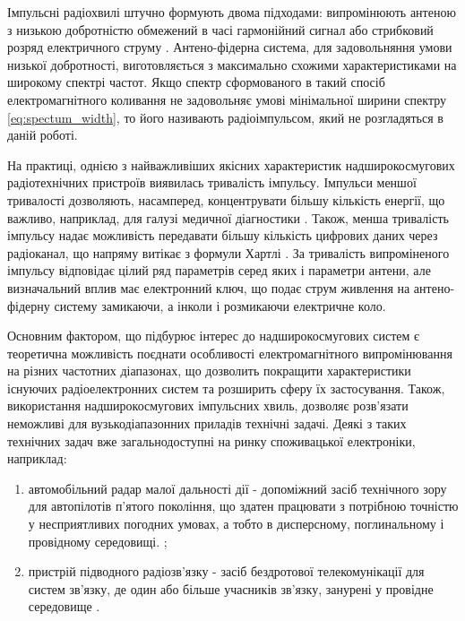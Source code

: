 Імпульсні радіохвилі штучно формують двома підходами: випромінюють антеною 
з низькою добротністю обмежений в часі гармонійний сигнал 
\cite{imp:Mesyas1963, imp:Mesyas1974} або стрибковий розряд електричного 
струму \cite{imp:BaumMN053}. Антено-фідерна система, для задовольняння 
умови низької добротності, виготовляється з максимально схожими 
характеристиками на широкому спектрі частот. Якщо спектр сформованого в 
такий спосіб електромагнітного коливання не задовольняє умові 
мінімальної ширини спектру \eqref{eq:spectum_width}, то його називають 
радіоімпульсом, який не розгладяться в даній роботі.

На практиці, однією з найважливіших якісних характеристик надширокосмугових
радіотехнічних пристроїв виявилась тривалість імпульсу. Імпульси меншої 
тривалості дозволяють, насамперед, концентрувати більшу кількість енергії,
що важливо, наприклад, для галузі медичної діагностики 
\cite{imp:Guardiola2010}. Також, менша тривалість імпульсу надає 
можливість передавати більшу кількість цифрових даних через радіоканал, що 
напряму витікає з формули Хартлі \cite{imp:Taub1986}. За тривалість 
випроміненого імпульсу відповідає цілий ряд параметрів серед яких і 
параметри антени, але визначальний вплив має електронний ключ, що подає 
струм живлення на антено-фідерну систему замикаючи, а інколи і розмикаючи 
електричне коло.


Основним фактором, що підбурює інтерес до надширокосмугових систем є 
теоретична можливість поєднати особливості електромагнітного випромінювання 
на різних частотних діапазонах, що дозволить покращити характеристики 
існуючих радіоелектронних систем та розширить сферу їх застосування. 
Також, використання надширокосмугових імпульсних хвиль, дозволяє
розв'язати неможливі для вузькодіапазонних приладів технічні задачі. 
Деякі з таких технічних задач вже загальнодоступні на ринку споживацької 
електроніки, наприклад:

\begin{enumerate}
\item автомобільний радар малої дальності дії - допоміжний засіб 
технічного зору для автопілотів п'ятого покоління, що здатен працювати 
з потрібною точністю у несприятливих погодних умовах, а тобто в 
дисперсному, поглинальному і провідному середовищі.
\cite{imp:Yarovoy2017};
\item пристрій підводного радіозв'язку - засіб бездротової 
телекомунікації для систем зв'язку, де один або більше учасників 
зв'язку, занурені у провідне середовище \cite{imp:Garcia2009, 
imp:Karagianni2015}.
\end{enumerate}

